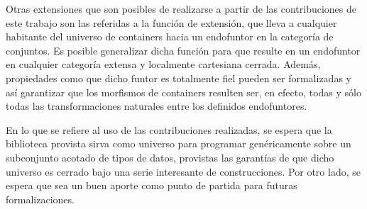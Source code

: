 Otras extensiones que son posibles de realizarse a partir de las contribuciones de este trabajo son las referidas a la función de extensión, que lleva a cualquier habitante del universo de containers hacia un endofuntor en la categoría de conjuntos. Es posible generalizar dicha función para que resulte en un endofuntor en cualquier categoría extensa y localmente cartesiana cerrada. Además, propiedades como que dicho funtor es totalmente fiel pueden ser formalizadas y así garantizar que los morfismos de containers resulten ser, en efecto, todas y sólo todas las transformaciones naturales entre los definidos endofuntores. 

En lo que se refiere al uso de las contribuciones realizadas, se espera que la biblioteca provista sirva como universo para programar genéricamente sobre un subconjunto acotado de tipos de datos, provistas las garantías de que dicho universo es cerrado bajo una serie interesante de construcciones. Por otro lado, se espera que sea un buen aporte como punto de partida para futuras formalizaciones. 







